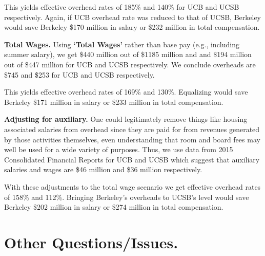 \documentclass[11pt]{article}
\begin{document}
This yields effective overhead rates of 185\% and 140\% for UCB and
UCSB respectively.  Again, if UCB overhead rate was reduced to that of
UCSB, Berkeley would save Berkeley \$170 million in salary or \$232
million in total compensation.

{\bf Total Wages.} Using {\bf `Total Wages'} rather than base pay
(e.g., including summer salary), we get \$440 million out of \$1185
million and and \$194 million out of \$447 million for UCB and UCSB
respectively.  We conclude overheads are \$745 and \$253 for UCB and UCSB
respectively. 

This yields effective overhead rates of 169\% and 130\%.  Equalizing
would save Berkeley \$171 million in salary or \$233 million in total
compensation. 

{\bf Adjusting for auxiliary.} One could legitimately remove things
like housing associated salaries from overhead since they are paid for
from revenues generated by those activities themselves, even
understanding that room and board fees may well be used for a wide
variety of purposes.  Thus, we use data from 2015 Consolidated
Financial Reports for UCB and UCSB
\cite{UCSB-consolidated,UCB-consolidated} which suggest that auxiliary
salaries and wages are \$46 million and \$36 million respectively.

With these adjustments to the total wage scenario we get effective
overhead rates of 158\% and 112\%.  Bringing Berkeley's overheads to
UCSB's level would save Berkeley \$202 million in salary or \$274
million in total compensation.



\section{Other Questions/Issues.}
\label{sec:healthcare}
\end{document}
